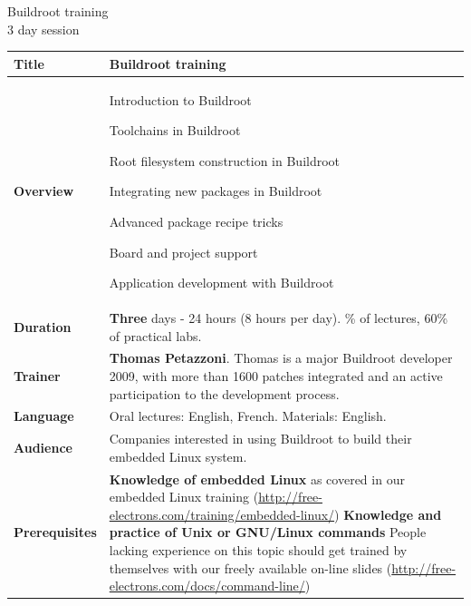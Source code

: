 \documentclass[a4paper,12pt,obeyspaces,spaces,hyphens]{article}
\begin{document}
\thispagestyle{fancy}

\setlength{\arrayrulewidth}{0.8pt}

\begin{center}
\LARGE
Buildroot training\\
\large
3 day session
\end{center}
\vspace{1cm}

\small
{}

 {
  \begin{tabularx}{\textwidth}{|g|h|}
    {\bf Title} & Buildroot training \\
    \hline

    {\bf Overview} &
    Introduction to Buildroot \par
    Toolchains in Buildroot \par
    Root filesystem construction in Buildroot \par
    Integrating new packages in Buildroot \par
    Advanced package recipe tricks \par
    Board and project support \par
    Application development with Buildroot \\
    \hline

    {\bf Duration} & {\bf Three} days - 24 hours (8 hours per day).
    \% of lectures, 60\% of practical labs. \\
    \hline

    {\bf Trainer} & {\bf Thomas Petazzoni}. Thomas is a major
    Buildroot developer 2009, with more than 1600 patches integrated
    and an active
    participation to the development process.\\
    \hline

    {\bf Language} & Oral lectures: English, French.
    \newline Materials: English.\\
    \hline

    {\bf Audience} & Companies interested in using Buildroot to build
    their
    embedded Linux system.\\
    \hline

    {\bf Prerequisites} & {\bf Knowledge of embedded Linux} as covered
    in our embedded Linux training
    (\url{http://free-electrons.com/training/embedded-linux/}) \newline 
    {\bf Knowledge and practice of Unix or GNU/Linux commands}
    \newline People lacking experience on this topic should get
    trained by themselves with our freely available on-line slides
    (\url{http://free-electrons.com/docs/command-line/}) \\
    \hline


\end{tabularx}}
\end{document}
